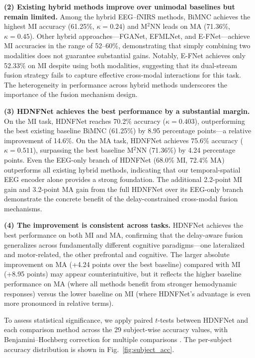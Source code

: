 \documentclass[preprint,12pt,authoryear]{elsarticle}
\begin{document}
\noindent\textbf{(2) Existing hybrid methods improve over unimodal baselines but remain limited.} Among the hybrid EEG--fNIRS methods, BiMNC achieves the highest MI accuracy (61.25\%, $\kappa = 0.24$) and M$^2$NN leads on MA (71.36\%, $\kappa = 0.45$). Other hybrid approaches---FGANet, EFMLNet, and E-FNet---achieve MI accuracies in the range of 52--60\%, demonstrating that simply combining two modalities does not guarantee substantial gains. Notably, E-FNet achieves only 52.33\% on MI despite using both modalities, suggesting that its dual-stream fusion strategy fails to capture effective cross-modal interactions for this task. The heterogeneity in performance across hybrid methods underscores the importance of the fusion mechanism design.

\noindent\textbf{(3) HDNFNet achieves the best performance by a substantial margin.} On the MI task, HDNFNet reaches 70.2\% accuracy ($\kappa = 0.403$), outperforming the best existing baseline BiMNC (61.25\%) by 8.95 percentage points---a relative improvement of 14.6\%. On the MA task, HDNFNet achieves 75.6\% accuracy ($\kappa = 0.511$), surpassing the best baseline M$^2$NN (71.36\%) by 4.24 percentage points. Even the EEG-only branch of HDNFNet (68.0\% MI, 72.4\% MA) outperforms all existing hybrid methods, indicating that our temporal-spatial EEG encoder alone provides a strong foundation. The additional 2.2-point MI gain and 3.2-point MA gain from the full HDNFNet over its EEG-only branch demonstrate the concrete benefit of the delay-constrained cross-modal fusion mechanisms.

\noindent\textbf{(4) The improvement is consistent across tasks.} HDNFNet achieves the best performance on both MI and MA, confirming that the delay-aware fusion generalizes across fundamentally different cognitive paradigms---one lateralized and motor-related, the other prefrontal and cognitive. The larger absolute improvement on MA (+4.24 points over the best baseline) compared with MI (+8.95 points) may appear counterintuitive, but it reflects the higher baseline performance on MA (where all methods benefit from stronger hemodynamic responses) versus the lower baseline on MI (where HDNFNet's advantage is even more pronounced in relative terms).

To assess statistical significance, we apply paired $t$-tests between HDNFNet and each comparison method across the 29 subject-wise accuracy values, with Benjamini--Hochberg correction for multiple comparisons \citep{benjamini1995controlling}. The per-subject accuracy distribution is shown in Fig.~\ref{fig:subject_acc}.
\end{document}
